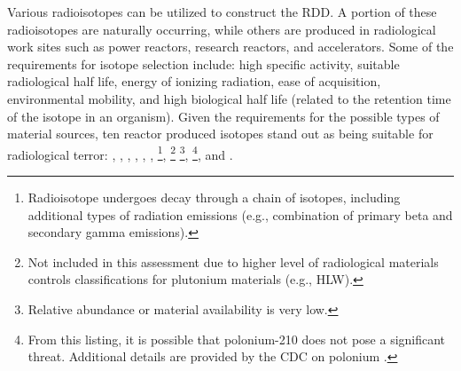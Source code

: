 \documentclass{report}
\begin{document}
Various radioisotopes can be utilized to construct the RDD.  A portion of these radioisotopes are naturally occurring, while others are produced in radiological work sites such as power reactors, research reactors, and accelerators.  Some of the requirements for isotope selection include: high specific activity, suitable radiological half life, energy of ionizing radiation, ease of acquisition, environmental mobility, and high biological half life (related to the retention time of the isotope in an organism).  Given the requirements for the possible types of material sources, ten reactor produced isotopes stand out as being suitable for radiological terror:  , , , , , ,  
\footnote{Radioisotope undergoes decay through a chain of isotopes, including additional types of radiation emissions (e.g., combination of primary beta and secondary gamma emissions).}, 
 \footnotemark[2] \footnote{Not included in this assessment due to higher level of radiological materials controls classifications for plutonium materials (e.g., HLW).} 
\footnote{Relative abundance or material availability is very low.}, 
 \footnotemark[2] \footnotemark[4] \footnote{From this listing, it is possible that polonium-210 does not pose a significant threat. Additional details are provided by the CDC on polonium \cite{CentersforDiseaseControlandPrevention2014}.}, 
and  \footnotemark[2] \footnotemark[4].



% 
\end{document}
